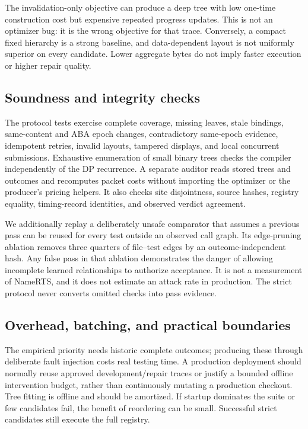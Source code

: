 The invalidation-only objective can produce a deep tree with low one-time construction cost but expensive repeated progress updates. This is not an optimizer bug: it is the wrong objective for that trace. Conversely, a compact fixed hierarchy is a strong baseline, and data-dependent layout is not uniformly superior on every candidate. Lower aggregate bytes do not imply faster execution or higher repair quality.

\subsection{Soundness and integrity checks}

The protocol tests exercise complete coverage, missing leaves, stale bindings, same-content and ABA epoch changes, contradictory same-epoch evidence, idempotent retries, invalid layouts, tampered displays, and local concurrent submissions. Exhaustive enumeration of small binary trees checks the compiler independently of the DP recurrence. A separate auditor reads stored trees and outcomes and recomputes packet costs without importing the optimizer or the producer's pricing helpers. It also checks site disjointness, source hashes, registry equality, timing-record identities, and observed verdict agreement.

We additionally replay a deliberately unsafe comparator that assumes a previous pass can be reused for every test outside an observed call graph. Its edge-pruning ablation removes three quarters of file--test edges by an outcome-independent hash. Any false pass in that ablation demonstrates the danger of allowing incomplete learned relationships to authorize acceptance. It is not a measurement of NameRTS, and it does not estimate an attack rate in production. The strict protocol never converts omitted checks into pass evidence.

\subsection{Overhead, batching, and practical boundaries}

The empirical priority needs historic complete outcomes; producing these through deliberate fault injection costs real testing time. A production deployment should normally reuse approved development/repair traces or justify a bounded offline intervention budget, rather than continuously mutating a production checkout. Tree fitting is offline and should be amortized. If startup dominates the suite or few candidates fail, the benefit of reordering can be small. Successful strict candidates still execute the full registry.
